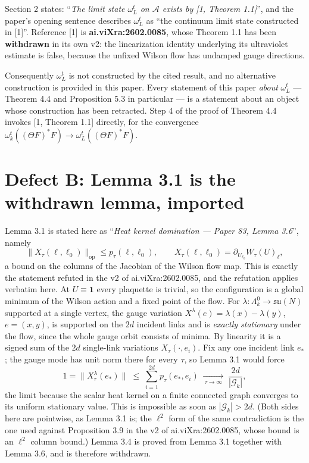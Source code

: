 \documentclass[11pt]{article}
\begin{document}
Section 2 states: ``\emph{The limit state $\omega^t_L$ on $\mathcal A$ exists by
[1, Theorem 1.1]}'', and the paper's opening sentence describes $\omega^t_L$ as ``the
continuum limit state constructed in [1]''. Reference [1] is
\textbf{ai.viXra:2602.0085}, whose Theorem 1.1 has been \textbf{withdrawn} in its own
v2: the linearization identity underlying its ultraviolet estimate is false, because
the unfixed Wilson flow has undamped gauge directions.

Consequently $\omega^t_L$ is not constructed by the cited result, and no alternative
construction is provided in this paper. Every statement of this
paper \emph{about} $\omega^t_L$ --- Theorem 4.4 and Proposition 5.3 in particular ---
is a statement about an object whose construction has been retracted. Step 4 of the
proof of Theorem 4.4 invokes [1, Theorem 1.1] directly, for the convergence
$\omega^t_k((\Theta F)^*F)\to\omega^t_L((\Theta F)^*F)$.

\section{Defect B: Lemma 3.1 is the withdrawn lemma, imported}

Lemma 3.1 is stated here as ``\emph{Heat kernel domination --- Paper 83, Lemma 3.6}'',
namely
\[
\|X_\tau(\ell,\ell_0)\|_{\mathrm{op}}\le p_\tau(\ell,\ell_0),
\qquad X_\tau(\ell,\ell_0)=\partial_{U_{\ell_0}}W_\tau(U)_\ell ,
\]
a bound on the columns of the Jacobian of the Wilson flow map. This is exactly the
statement refuted in the v2 of ai.viXra:2602.0085, and the refutation applies verbatim
here. At $U\equiv\mathbf 1$ every plaquette is trivial, so the configuration is a
global minimum of the Wilson action and a fixed point of the flow. For
$\lambda:\Lambda^0_k\to\mathfrak{su}(N)$ supported at a single vertex, the gauge
variation $X^\lambda(e)=\lambda(x)-\lambda(y)$, $e=(x,y)$, is supported on the $2d$
incident links and is \emph{exactly stationary} under the flow, since the whole gauge
orbit consists of minima. By linearity it is a signed sum of the $2d$ single-link
variations $X_\tau(\cdot,e_i)$. Fix any one incident link $e_*$; the gauge mode has
unit norm there for every $\tau$, so Lemma 3.1 would force
\[
1=\bigl\|X^\lambda_\tau(e_*)\bigr\|\;\le\;\sum_{i=1}^{2d}p_\tau(e_*,e_i)
\;\xrightarrow[\ \tau\to\infty\ ]{}\;\frac{2d}{|\mathcal G_k|},
\]
the limit because the scalar heat kernel on a finite connected graph converges to its
uniform stationary value. This is impossible as soon as $|\mathcal G_k|>2d$. (Both
sides here are pointwise, as Lemma 3.1 is; the $\ell^2$ form of the same contradiction
is the one used against Proposition 3.9 in the v2 of ai.viXra:2602.0085, whose bound
is an $\ell^2$ column bound.) Lemma 3.4 is proved from Lemma 3.1 together with Lemma
3.6, and is therefore withdrawn.
\end{document}
